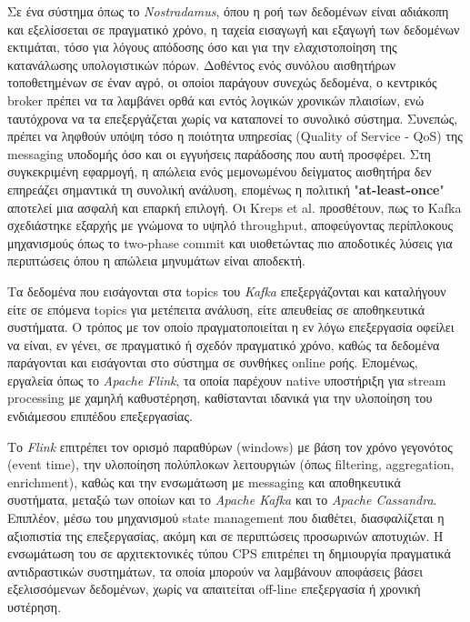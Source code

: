 Σε ένα σύστημα όπως το \textit{Nostradamus}, όπου η ροή των δεδομένων είναι
αδιάκοπη και εξελίσσεται σε πραγματικό χρόνο, η ταχεία εισαγωγή και εξαγωγή των
δεδομένων εκτιμάται, τόσο για λόγους απόδοσης όσο και για την ελαχιστοποίηση
της κατανάλωσης υπολογιστικών πόρων. Δοθέντος ενός συνόλου αισθητήρων
τοποθετημένων σε έναν αγρό, οι οποίοι παράγουν συνεχώς δεδομένα, ο κεντρικός
broker πρέπει να τα λαμβάνει ορθά και εντός λογικών χρονικών πλαισίων, ενώ
ταυτόχρονα να τα επεξεργάζεται χωρίς να καταπονεί το συνολικό σύστημα. Συνεπώς,
πρέπει να ληφθούν υπόψη τόσο η ποιότητα υπηρεσίας (Quality of Service - QoS)
της messaging υποδομής όσο και οι εγγυήσεις παράδοσης που αυτή προσφέρει. Στη
συγκεκριμένη εφαρμογή, η απώλεια ενός μεμονωμένου δείγματος αισθητήρα δεν
επηρεάζει σημαντικά τη συνολική ανάλυση, επομένως η πολιτική
"\textbf{at-least-once}" αποτελεί μια ασφαλή και επαρκή επιλογή. Οι Kreps et
al. \cite{kafkaoriginal} προσθέτουν, πως το Kafka σχεδιάστηκε εξαρχής με
γνώμονα το υψηλό throughput, αποφεύγοντας περίπλοκους μηχανισμούς όπως το
two-phase commit και υιοθετώντας πιο αποδοτικές λύσεις για περιπτώσεις όπου η
απώλεια μηνυμάτων είναι αποδεκτή.

Τα δεδομένα που εισάγονται στα topics του \textit{Kafka} επεξεργάζονται και
καταλήγουν είτε σε επόμενα topics για μετέπειτα ανάλυση, είτε απευθείας σε
αποθηκευτικά συστήματα. Ο τρόπος με τον οποίο πραγματοποιείται η εν λόγω
επεξεργασία οφείλει να είναι, εν γένει, σε πραγματικό ή σχεδόν πραγματικό
χρόνο, καθώς τα δεδομένα παράγονται και εισάγονται στο σύστημα σε συνθήκες
online ροής. Επομένως, εργαλεία όπως το \textit{Apache Flink}, τα οποία
παρέχουν native υποστήριξη για stream processing με χαμηλή καθυστέρηση,
καθίστανται ιδανικά για την υλοποίηση του ενδιάμεσου επιπέδου επεξεργασίας.

Το \textit{Flink} επιτρέπει τον ορισμό παραθύρων (windows) με βάση τον χρόνο
γεγονότος (event time), την υλοποίηση πολύπλοκων λειτουργιών (όπως filtering,
aggregation, enrichment), καθώς και την ενσωμάτωση με messaging και
αποθηκευτικά συστήματα, μεταξώ των οποίων και το \textit{Apache Kafka} και το
\textit{Apache Cassandra}. Επιπλέον, μέσω του μηχανισμού state management που
διαθέτει, διασφαλίζεται η αξιοπιστία της επεξεργασίας, ακόμη και σε περιπτώσεις
προσωρινών αποτυχιών. Η ενσωμάτωση του σε αρχιτεκτονικές τύπου CPS επιτρέπει τη
δημιουργία πραγματικά αντιδραστικών συστημάτων, τα οποία μπορούν να λαμβάνουν
αποφάσεις βάσει εξελισσόμενων δεδομένων, χωρίς να απαιτείται off-line
επεξεργασία ή χρονική υστέρηση.

